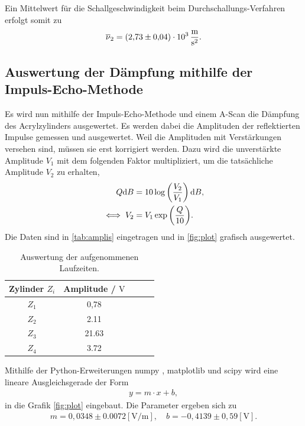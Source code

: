 Ein Mittelwert für die Schallgeschwindigkeit beim Durchschallungs-Verfahren erfolgt somit zu
\begin{align*}
  \overline \nu_2 = \SI{2,73 \pm 0,04 e3}{\meter\per\second\squared}.
\end{align*}

\subsection{Auswertung der Dämpfung mithilfe der Impuls-Echo-Methode}
\label{subsec:daempfung}

Es wird nun mithilfe der Impuls-Echo-Methode und einem A-Scan die Dämpfung des Acrylzylinders ausgewertet.
Es werden dabei die Amplituden der reflektierten Impulse gemessen und ausgewertet.
Weil die Amplituden mit Verstärkungen versehen sind, müssen sie erst korrigiert werden. Dazu wird die unverstärkte Amplitude $V_1$
mit dem folgenden Faktor multipliziert, um die tatsächliche Amplitude $V_2$ zu erhalten,
\begin{align*}
  Q \text dB &= 10\log\left(\frac{V_2}{V_1}\right) \text dB,\\
  \iff V_2 &= V_1\exp{\left(\frac{Q}{10}\right) }.
\end{align*}
Die Daten sind in \autoref{tab:amplis} eingetragen und in \autoref{fig:plot} grafisch ausgewertet.

\begin{table}
  \centering
  \caption{Auswertung der aufgenommenen Laufzeiten.}
  \label{tab:amplis}
  \begin{tabular}{c c c c c}
    \toprule
    Zylinder $Z_i$ &  Amplitude / $\si{\volt}$ \\
    \midrule
    $Z_1$ & 0,78 \\
    $Z_2$ & 2.11 \\
    $Z_3$ & 21.63 \\
    $Z_4$ & 3.72 \\
    \bottomrule
  \end{tabular}
\end{table}

Mithilfe der Python-Erweiterungen numpy \cite{numpy}, matplotlib \cite{matplotlib} und scipy \cite{scipy} wird eine lineare Ausgleichsgerade
der Form
\begin{align*}
  y = m\cdot x + b,
\end{align*}
in die Grafik \ref{fig:plot} eingebaut. Die Parameter ergeben sich zu
\begin{align*}
  m = 0,0348 \pm 0.0072 \left[\si{\volt\per\meter}\right], \quad b = -0,4139 \pm 0,59 \left[\si{\volt}\right].
\end{align*}

